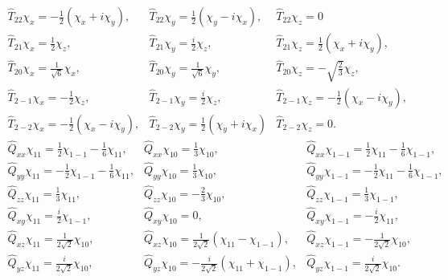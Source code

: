 \begin{equation}
\begin{array}{lll}
\hat{T}_{22} \chi_{x}=-\frac{1}{2}\left(\chi_{x}+i \chi_{y}\right), & \hat{T}_{22} \chi_{y}=\frac{1}{2}\left(\chi_{y}-i \chi_{x}\right), & \hat{T}_{22} \chi_{z}=0 \\
\hat{T}_{21} \chi_{x}=\frac{1}{2} \chi_{z}, & \hat{T}_{21} \chi_{y}=\frac{i}{2} \chi_{z}, & \hat{T}_{21} \chi_{z}=\frac{1}{2}\left(\chi_{x}+i \chi_{y}\right), \\
\hat{T}_{20} \chi_{x}=\frac{1}{\sqrt{6}} \chi_{x}, & \hat{T}_{20} \chi_{y}=\frac{1}{\sqrt{6}} \chi_{y}, & \hat{T}_{20} \chi_{z}=-\sqrt{\frac{2}{3}} \chi_{z}, \label{eq:6:3:31}\\
\hat{T}_{2-1} \chi_{x}=-\frac{1}{2} \chi_{z}, & \hat{T}_{2-1} \chi_{y}=\frac{i}{2} \chi_{z}, & \hat{T}_{2-1} \chi_{z}=-\frac{1}{2}\left(\chi_{x}-i \chi_{y}\right), \\
\hat{T}_{2-2} \chi_{x}=-\frac{1}{2}\left(\chi_{x}-i \chi_{y}\right), & \hat{T}_{2-2} \chi_{y}=\frac{1}{2}\left(\chi_{y}+i \chi_{x}\right) & \hat{T}_{2-2} \chi_{z}=0 .
\end{array}
\end{equation}
\begin{equation}
\begin{array}{lll}
\hat{Q}_{x x} \chi_{11}=\frac{1}{2} \chi_{1-1}-\frac{1}{6} \chi_{11}, & \hat{Q}_{x x} \chi_{10}=\frac{1}{3} \chi_{10}, & \hat{Q}_{x x} \chi_{1-1}=\frac{1}{2} \chi_{11}-\frac{1}{6} \chi_{1-1}, \\
\hat{Q}_{y y} \chi_{11}=-\frac{1}{2} \chi_{1-1}-\frac{1}{6} \chi_{11}, & \hat{Q}_{y y} \chi_{10}=\frac{1}{3} \chi_{10}, & \hat{Q}_{y y} \chi_{1-1}=-\frac{1}{2} \chi_{11}-\frac{1}{6} \chi_{1-1}, \\
\hat{Q}_{z z} \chi_{11}=\frac{1}{3} \chi_{11}, & \hat{Q}_{z z} \chi_{10}=-\frac{2}{3} \chi_{10}, & \hat{Q}_{z z} \chi_{1-1}=\frac{1}{3} \chi_{1-1}, \\
\hat{Q}_{x y} \chi_{11}=\frac{i}{2} \chi_{1-1}, & \hat{Q}_{x y} \chi_{10}=0, & \hat{Q}_{x y} \chi_{1-1}=-\frac{i}{2} \chi_{11}, \\
\hat{Q}_{x z} \chi_{11}=\frac{1}{2 \sqrt{2}} \chi_{10}, & \hat{Q}_{x z} \chi_{10}=\frac{1}{2 \sqrt{2}}\left(\chi_{11}-\chi_{1-1}\right), & \hat{Q}_{x z} \chi_{1-1}=-\frac{1}{2 \sqrt{2}} \chi_{10}, \\
\hat{Q}_{y z} \chi_{11}=\frac{i}{2 \sqrt{2}} \chi_{10}, & \hat{Q}_{y z} \chi_{10}=-\frac{i}{2 \sqrt{2}}\left(\chi_{11}+\chi_{1-1}\right), & \hat{Q}_{y z} \chi_{1-1}=\frac{i}{2 \sqrt{2}} \chi_{10} .
\end{array} \label{eq:6:3:32}
\end{equation}
